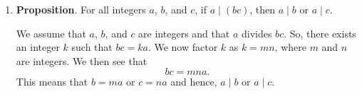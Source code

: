 \begin{enumerate}
\begin{enumerate}
%

%

\item \textbf{Proposition}. For all integers $a$, $b$, and $c$, if 
$a \mid \left( bc \right)$, then $a \mid b$ or $a \mid c$.

\begin{myproof}
We assume that $a$, $b$, and $c$ are integers and that $a$ divides $bc$.  So, there exists an integer $k$ such that $bc = ka$.
\noindent
We now factor $k$ as $k = mn$, where $m$ and $n$ are integers.  We then see that
\[
bc = mna.
\]
\noindent
This means that $b = ma$ or $c = na$ and hence, $a \mid b$ or $a \mid c$.
\end{myproof}


\end{enumerate}
\end{enumerate}
